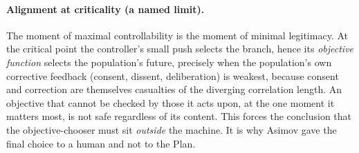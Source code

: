 \documentclass[11pt]{article}
\begin{document}
\paragraph{Alignment at criticality (a named limit).} The moment of maximal controllability is the moment of minimal legitimacy. At the critical point the controller's small push selects the branch, hence its \emph{objective function} selects the population's future, precisely when the population's own corrective feedback (consent, dissent, deliberation) is weakest, because consent and correction are themselves casualties of the diverging correlation length. An objective that cannot be checked by those it acts upon, at the one moment it matters most, is not safe regardless of its content. This forces the conclusion that the objective-chooser must sit \emph{outside} the machine. It is why Asimov gave the final choice to a human and not to the Plan.
\end{document}
